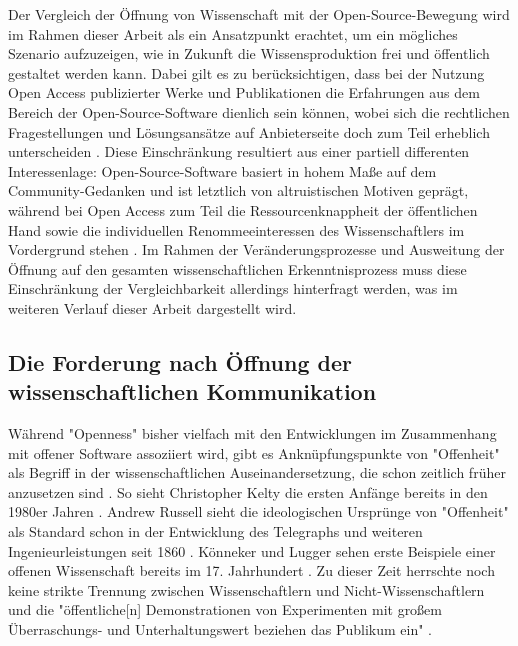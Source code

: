 Der Vergleich der Öffnung von Wissenschaft mit der Open-Source-Bewegung wird im Rahmen dieser Arbeit als ein Ansatzpunkt erachtet, um ein mögliches Szenario aufzuzeigen, wie in Zukunft die Wissensproduktion frei und öffentlich gestaltet werden kann. Dabei gilt es zu berücksichtigen, dass bei der Nutzung Open Access publizierter Werke und Publikationen die Erfahrungen aus dem Bereich der Open-Source-Software dienlich sein können, wobei sich die rechtlichen Fragestellungen und Lösungsansätze auf Anbieterseite doch zum Teil erheblich unterscheiden \cite{Dorschel_2006}. Diese Einschränkung resultiert aus einer partiell differenten Interessenlage: Open-Source-Software basiert in hohem Maße auf dem Community-Gedanken und ist letztlich von altruistischen Motiven geprägt, während bei Open Access zum Teil die Ressourcenknappheit der öffentlichen Hand sowie die individuellen Renommeeinteressen des Wissenschaftlers im Vordergrund stehen \cite{Dorschel_2006}. Im Rahmen der Veränderungsprozesse und Ausweitung der Öffnung auf den gesamten wissenschaftlichen Erkenntnisprozess muss diese Einschränkung der Vergleichbarkeit allerdings hinterfragt werden, was im weiteren Verlauf dieser Arbeit dargestellt wird.

\subsection{Die Forderung nach Öffnung der wissenschaftlichen Kommunikation}

Während "Openness" bisher vielfach mit den Entwicklungen im Zusammenhang mit offener Software assoziiert wird, gibt es Anknüpfungspunkte von "Offenheit" als Begriff in der wissenschaftlichen Auseinandersetzung, die schon zeitlich früher anzusetzen sind \cite{Tkacz_2014}. So sieht Christopher Kelty die ersten Anfänge bereits in den 1980er Jahren \cite{Kelty_2008}. Andrew Russell sieht die ideologischen Ursprünge von "Offenheit" als Standard schon in der Entwicklung des Telegraphs und weiteren Ingenieurleistungen seit 1860 \cite{Russell_2014}. Könneker und Lugger sehen erste Beispiele einer offenen Wissenschaft bereits im 17. Jahrhundert \cite{Konneker_2013}. Zu dieser Zeit herrschte noch keine strikte Trennung zwischen Wissenschaftlern und Nicht-Wissenschaftlern und die "öffentliche[n] Demonstrationen von Experimenten mit großem Überraschungs- und Unterhaltungswert beziehen das Publikum ein" \cite{Weingart_2005}.

